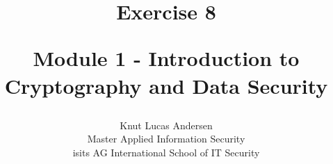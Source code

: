 \title{ 
	\begin{center} \textbf{ Exercise 8 } \end{center}
	\begin{center} {\large Module 1 - Introduction to Cryptography and Data Security } \end{center}
}

\author{ 
	Knut Lucas Andersen \\
	Master Applied Information Security \\
	isits AG International School of IT Security
}